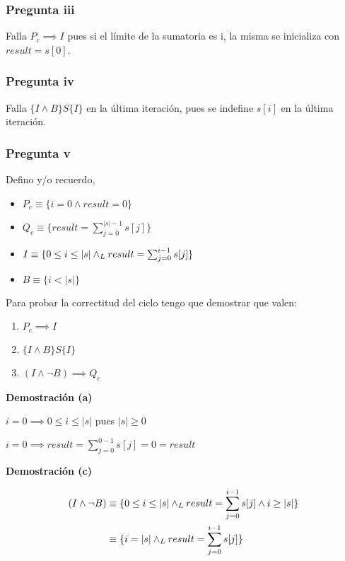\subsubsection{Pregunta iii}

Falla $ P_c \implies I $ pues si el límite de la sumatoria es i, la misma se inicializa con $result = s[0]$.

\subsubsection{Pregunta iv}

Falla $ \{ I \wedge B \}S\{ I \} $ en la última iteración, pues se indefine $ s[i] $ en la última iteración.

\subsubsection{Pregunta v}

Defino y/o recuerdo,
\begin{itemize}
    \item $ P_c \equiv \{ i = 0 \wedge result = 0 \} $
    \item $ Q_c \equiv \{ result = \sum_{j = 0}^{|s| - 1}s[j] \} $
    \item $ I \equiv \{ 0 \leq i \leq |s| \land _L result = \sum_{j = 0}^{i - 1}s[j] \} $
    \item $ B \equiv \{ i < |s| \} $
\end{itemize}

Para probar la correctitud del ciclo tengo que demostrar que valen:
\begin{enumerate}[label=(\alph*)]
    \item $ P_c \implies I $
    \item $ \{ I \wedge B \} S \{ I \} $
    \item $ (I \wedge \neg B) \implies Q_c $
\end{enumerate}

\textbf{Demostración (a)}

$ i = 0 \implies 0 \leq i \leq |s| $ pues $ |s| \geq 0 $

$ i = 0 \implies result = \sum_{j = 0}^{0 - 1}s[j] = 0 = result $

\textbf{Demostración (c)}

\begin{align*}
    (I \wedge \neg B) &\equiv \{ 0 \leq i \leq |s| \land _L result = \sum_{j = 0}^{i - 1}s[j] \wedge i \geq |s| \} \\
    &\equiv \{ i = |s| \land _L result = \sum_{j = 0}^{i - 1}s[j] \} \\
\end{align*}

